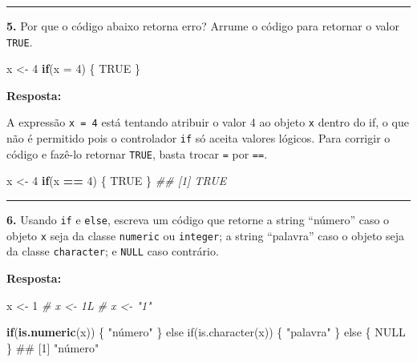 \documentclass[]{book}
\newenvironment{Shaded}{\begin{snugshade}}{\end{snugshade}}
\newcommand{\CommentTok}[1]{\textcolor[rgb]{0.56,0.35,0.01}{\textit{#1}}}
\newcommand{\ControlFlowTok}[1]{\textcolor[rgb]{0.13,0.29,0.53}{\textbf{#1}}}
\newcommand{\DataTypeTok}[1]{\textcolor[rgb]{0.13,0.29,0.53}{#1}}
\newcommand{\DecValTok}[1]{\textcolor[rgb]{0.00,0.00,0.81}{#1}}
\newcommand{\KeywordTok}[1]{\textcolor[rgb]{0.13,0.29,0.53}{\textbf{#1}}}
\newcommand{\NormalTok}[1]{#1}
\newcommand{\OperatorTok}[1]{\textcolor[rgb]{0.81,0.36,0.00}{\textbf{#1}}}
\newcommand{\OtherTok}[1]{\textcolor[rgb]{0.56,0.35,0.01}{#1}}
\newcommand{\StringTok}[1]{\textcolor[rgb]{0.31,0.60,0.02}{#1}}
\begin{document}
\begin{center}\rule{0.5\linewidth}{\linethickness}\end{center}

\textbf{5.} Por que o código abaixo retorna erro? Arrume o código para retornar o valor \texttt{TRUE}.

\begin{Shaded}
\begin{Highlighting}[]
\NormalTok{x <-}\StringTok{ }\DecValTok{4}
\ControlFlowTok{if}\NormalTok{(}\DataTypeTok{x =} \DecValTok{4}\NormalTok{) \{}
  \OtherTok{TRUE}
\NormalTok{\}}
\end{Highlighting}
\end{Shaded}

\textbf{Resposta:}

A expressão \texttt{x\ =\ 4} está tentando atribuir o valor 4 ao objeto \texttt{x} dentro do if, o que não é permitido pois o controlador \texttt{if} só aceita valores lógicos. Para corrigir o código e fazê-lo retornar \texttt{TRUE}, basta trocar \texttt{=} por \texttt{==}.

\begin{Shaded}
\begin{Highlighting}[]
\NormalTok{x <-}\StringTok{ }\DecValTok{4}
\ControlFlowTok{if}\NormalTok{(x }\OperatorTok{==}\StringTok{ }\DecValTok{4}\NormalTok{) \{}
  \OtherTok{TRUE}
\NormalTok{\}}
\CommentTok{## [1] TRUE}
\end{Highlighting}
\end{Shaded}

\begin{center}\rule{0.5\linewidth}{\linethickness}\end{center}

\textbf{6.} Usando \texttt{if} e \texttt{else}, escreva um código que retorne a string ``número'' caso o objeto \texttt{x} seja da classe \texttt{numeric} ou \texttt{integer}; a string ``palavra'' caso o objeto seja da classe \texttt{character}; e \texttt{NULL} caso contrário.

\textbf{Resposta:}

\begin{Shaded}
\begin{Highlighting}[]
\NormalTok{x <-}\StringTok{ }\DecValTok{1}
\CommentTok{# x <- 1L}
\CommentTok{# x <- "1"}

\ControlFlowTok{if}\NormalTok{(}\KeywordTok{is.numeric}\NormalTok{(x)) \{}
  \StringTok{"número"}
\StringTok{\} else if(is.character(x)) \{}
\StringTok{  "}\NormalTok{palavra}\StringTok{"}
\StringTok{\} else \{ }
\StringTok{  NULL}
\StringTok{\}}
\StringTok{## [1] "}\NormalTok{número"}
\end{Highlighting}
\end{Shaded}
\end{document}
